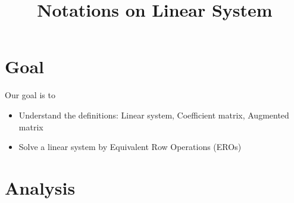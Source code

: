 \documentclass[11pt]{amsart}
\title{Notations on Linear System}
\begin{document}
\maketitle
\section{Goal}
Our goal is to
\begin{itemize}
 \item Understand the definitions:  Linear system, Coefficient matrix, Augmented matrix
 \item Solve a linear system by Equivalent Row Operations (EROs)
\end{itemize}
\section{Analysis}
\end{document}
